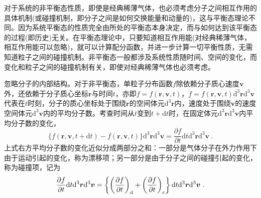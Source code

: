 \documentclass[12pt,a4paper]{article}
\renewcommand{\vec}[1]{\boldsymbol{#1}}
\newcommand{\dif}{\mathrm{d}}
\begin{document}
对于系统的非平衡态性质，即使是经典稀薄气体，也必须考虑分子之间相互作用的具体机制(或碰撞机制，即分子之间是如何交换能量和动量的)，这与平衡态理论不同。因为系统平衡态的性质完全由所处的平衡态本身决定，而与如何达到该平衡态的过程(即历史)无关。在平衡态理论中，只要知道相互作用能(对经典稀薄气体，相互作用能可以忽略)，就可以计算配分函数，并进一步计算一切平衡性质，无需知道粒子之间的碰撞机制。非平衡态一般都涉及系统性质随时间、空间的变化，而变化和粒子之间的碰撞机制有关，即使对经典稀薄气体也必须考虑。

忽略分子的内部结构。对于非平衡态，单粒子分布函数$f$除依赖分子质心速度$\vec{v}$外，还依赖于分子质心坐标$\vec{r}$与时间$t$，亦即$f=f(\vec{r}, \vec{v}, t)$，$f=f(\vec{r}, \vec{v}, t) \dif^3 \vec{r} \dif^3 \vec{v}$代表在$t$时刻，分子的质心坐标处于围绕$\vec{r}$的空间体元$\dif^3 \vec{r}$内，速度处于围绕$\vec{v}$的速度空间体元$\dif^3 \vec{v}$内的平均分子数。考查时间从$t$变到$t+\dif t$时，在固定体元$\dif^3 \vec{r} \dif^3 \vec{v}$内平均分子数的变化，
\begin{equation}
\{f(\vec{r}, \vec{v}, t+\dif t) - f(\vec{r}, \vec{v}, t)\} \dif^3 \vec{r} \dif^3 \vec{v} = \dfrac{\partial f}{\partial t} \dif t \dif^3 \vec{r} \dif^3 \vec{v} ~.
\end{equation}
上式右方平均分子数的变化近似分成两部分之和：一部分是气体分子在外力作用下由于运动引起的变化，称为漂移项；另一部分是由于分子之间的碰撞引起的变化，称为碰撞项，记为
\begin{equation}
\dfrac{\partial f}{\partial t} \dif t \dif^3 \vec{r} \dif^3 \vec{v} = \left\{\left( \dfrac{\partial f}{\partial t} \right)_{\rm d} +\left(\dfrac{\partial f}{\partial t} \right)_{\rm c} \right\} \dif t \dif^3 \vec{r} \dif^3 \vec{v} ~.
\end{equation}
\end{document}
